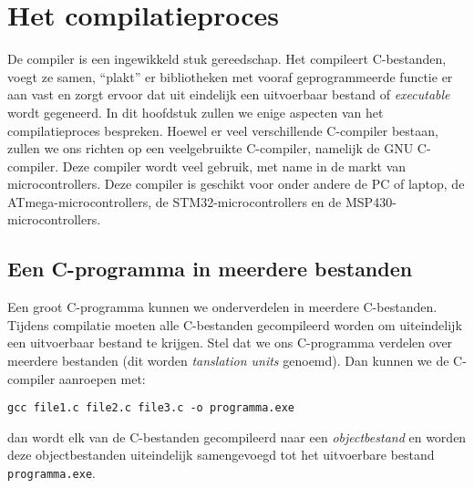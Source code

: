 \chapter{Het compilatieproces}
\label{cha:compilatieproces}
\thispagestyle{empty}

De compiler is een ingewikkeld stuk gereedschap. Het compileert C-bestanden, voegt ze samen, ``plakt'' er bibliotheken met vooraf geprogrammeerde functie er aan vast en zorgt ervoor dat uit eindelijk een uitvoerbaar bestand of \textsl{executable} wordt gegeneerd. In dit hoofdstuk zullen we enige aspecten van het compilatieproces bespreken. Hoewel er veel verschillende C-compiler bestaan, zullen we ons richten op een veelgebruikte C-compiler, namelijk de GNU C-compiler. Deze compiler wordt veel gebruik, met name in de markt van microcontrollers. Deze compiler is geschikt voor onder andere de PC of laptop, de ATmega-microcontrollers, de STM32-microcontrollers en de MSP430-microcontrollers.



\section{Een C-programma in meerdere bestanden}
Een groot C-programma kunnen we onderverdelen in meerdere C-bestanden. Tijdens compilatie moeten alle C-bestanden gecompileerd worden om uiteindelijk een uitvoerbaar bestand te krijgen. Stel dat we ons C-programma verdelen over meerdere bestanden (dit worden \textsl{tanslation units} genoemd). Dan kunnen we de C-compiler aanroepen met:

\hspace*{1em}\texttt{gcc file1.c file2.c file3.c -o programma.exe}

dan wordt elk van de C-bestanden gecompileerd naar een \textsl{objectbestand} en worden deze objectbestanden uiteindelijk samengevoegd tot het uitvoerbare bestand \texttt{programma.exe}.



